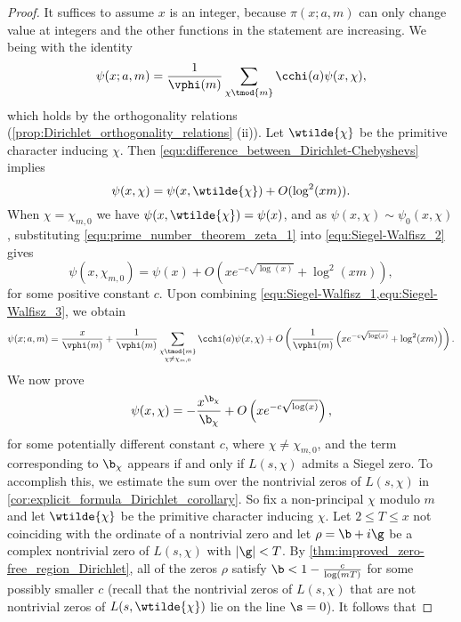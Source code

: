     \begin{proof}
      It suffices to assume $x$ is an integer, because $\pi(x;a,m)$ can only change value at integers and the other functions in the statement are increasing. We being with the identity
      \begin{equation}\label{equ:Siegel-Walfisz_1}
        \psi(x;a,m) = \frac{1}{\vphi(m)}\sum_{\chi \tmod{m}}\cchi(a)\psi(x,\chi),
      \end{equation}
      which holds by the orthogonality relations (\cref{prop:Dirichlet_orthogonality_relations} (ii)). Let $\wtilde{\chi}$ be the primitive character inducing $\chi$. Then \cref{equ:difference_between_Dirichlet-Chebyshevs} implies
      \begin{equation}\label{equ:Siegel-Walfisz_2}
        \psi(x,\chi) = \psi(x,\wtilde{\chi})+O(\log^{2}(xm)).
      \end{equation}
      When $\chi = \chi_{m,0}$ we have $\psi(x,\wtilde{\chi}) = \psi(x)$, and as $\psi(x,\chi) \sim \psi_{0}(x,\chi)$, substituting \cref{equ:prime_number_theorem_zeta_1} into \cref{equ:Siegel-Walfisz_2} gives
      \begin{equation}\label{equ:Siegel-Walfisz_3}
        \psi(x,\chi_{m,0}) = \psi(x)+O\left(xe^{-c\sqrt{\log(x)}}+\log^{2}(xm)\right),
      \end{equation}
      for some positive constant $c$. Upon combining \cref{equ:Siegel-Walfisz_1,equ:Siegel-Walfisz_3}, we obtain
      \begin{equation}\label{equ:Siegel-Walfisz_4}
        \psi(x;a,m) = \frac{x}{\vphi(m)}+\frac{1}{\vphi(m)}\sum_{\substack{\chi \tmod{m} \\ \chi \neq \chi_{m,0}}}\cchi(a)\psi(x,\chi)+O\left(\frac{1}{\vphi(m)}\left(xe^{-c\sqrt{\log(x)}}+\log^{2}(xm)\right)\right).
      \end{equation}
      We now prove
      \begin{equation}\label{equ:Siegel-Walfisz_5}
        \psi(x,\chi) = -\frac{x^{\b_{\chi}}}{\b_{\chi}}+O\left(xe^{-c\sqrt{\log(x)}}\right),
      \end{equation}
      for some potentially different constant $c$, where $\chi \neq \chi_{m,0}$, and the term corresponding to $\b_{\chi}$ appears if and only if $L(s,\chi)$ admits a Siegel zero. To accomplish this, we estimate the sum over the nontrivial zeros of $L(s,\chi)$ in \cref{cor:explicit_formula_Dirichlet_corollary}. So fix a non-principal $\chi$ modulo $m$ and let $\wtilde{\chi}$ be the primitive character inducing $\chi$. Let $2 \le T \le x$ not coinciding with the ordinate of a nontrivial zero and let $\rho = \b+i\g$ be a complex nontrivial zero of $L(s,\chi)$ with $|\g| < T$. By \cref{thm:improved_zero-free_region_Dirichlet}, all of the zeros $\rho$ satisfy $\b < 1-\frac{c}{\log(mT)}$ for some possibly smaller $c$ (recall that the nontrivial zeros of $L(s,\chi)$ that are not nontrivial zeros of $L(s,\wtilde{\chi})$ lie on the line $\s = 0$). It follows that

\end{proof}
